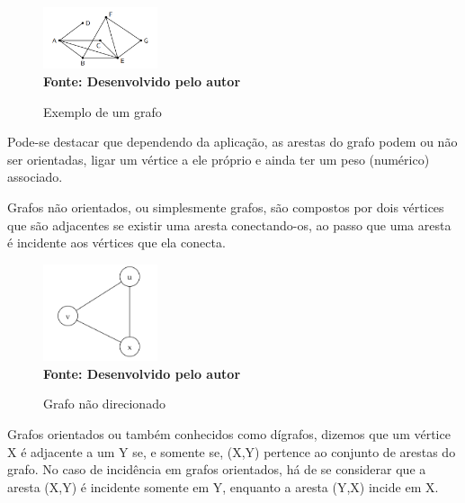 \begin{figure}[ht]
	\centering	
	\caption[\hspace{0.1cm}Exemplo de um grafo.]{Exemplo de um grafo}
	\vspace{-0.4cm}
	\includegraphics[width=0.3\textwidth]{figuras/exemplo-grafo.png}
	 \vspace{-0.2cm}
	\\\textbf{\footnotesize Fonte: Desenvolvido pelo autor}
	\label{fig:figura1}
\end{figure}

Pode-se destacar que dependendo da aplicação, as arestas do grafo podem ou não ser orientadas, ligar um vértice a ele próprio e ainda ter um peso (numérico) associado.

Grafos não orientados, ou simplesmente grafos, são compostos por dois vértices que são adjacentes se existir uma aresta conectando-os, ao passo que uma aresta é incidente aos vértices que ela conecta. 

\begin{figure}[ht]
	\centering	
	\caption[\hspace{0.1cm}Grafo não direcionado.]{Grafo não direcionado}
	\vspace{-0.4cm}
	\includegraphics[width=0.3\textwidth]{figuras/grafo-nao-direcionado.png}
	 \vspace{-0.2cm}
	\\\textbf{\footnotesize Fonte: Desenvolvido pelo autor}
	\label{fig:figura1}
\end{figure}

Grafos orientados ou também conhecidos como dígrafos, dizemos que um vértice X é adjacente a um Y se, e somente se, (X,Y) pertence ao conjunto de arestas do grafo. No caso de incidência em grafos orientados, há de se considerar que a aresta (X,Y) é incidente somente em Y, enquanto a aresta (Y,X) incide em X.

